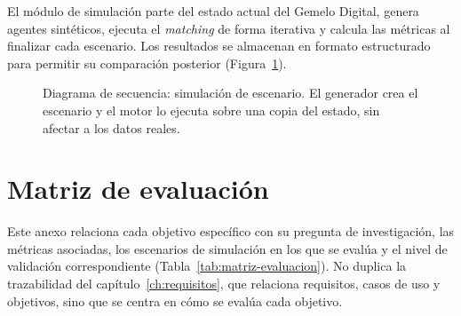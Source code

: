 El módulo de simulación parte del estado actual del Gemelo Digital, genera agentes sintéticos, ejecuta el \textit{matching} de forma iterativa y calcula las métricas al finalizar cada escenario. Los resultados se almacenan en formato estructurado para permitir su comparación posterior (Figura~\ref{fig:secuencia-simulacion}).

\begin{figure}[H]
  \centering
  
  \caption[Diagrama de secuencia: simulación de escenario]{Diagrama de secuencia: simulación de escenario. El generador crea el escenario y el motor lo ejecuta sobre una copia del estado, sin afectar a los datos reales.}
  \label{fig:secuencia-simulacion}
\end{figure}

\chapter{Matriz de evaluación}
\label{anx:matriz-evaluacion}

Este anexo relaciona cada objetivo específico con su pregunta de investigación, las métricas asociadas, los escenarios de simulación en los que se evalúa y el nivel de validación correspondiente (Tabla~\ref{tab:matriz-evaluacion}). No duplica la trazabilidad del capítulo~\ref{ch:requisitos}, que relaciona requisitos, casos de uso y objetivos, sino que se centra en cómo se evalúa cada objetivo.

